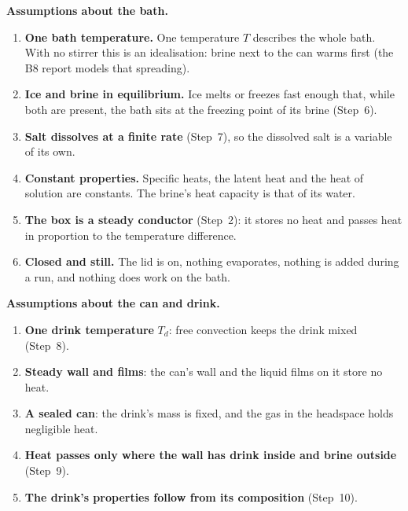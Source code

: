 \documentclass[11pt,a4paper]{article}
\newcommand{\para}[1]{\par\smallskip\noindent\textbf{#1}\enspace}
\begin{document}
\para{Assumptions about the bath.}
\begin{enumerate}[label=\textbf{B\arabic*}]
\item \textbf{One bath temperature.} One temperature $T$ describes the whole bath. With no stirrer this
  is an idealisation: brine next to the can warms first (the B8 report models that spreading).
\item \textbf{Ice and brine in equilibrium.} Ice melts or freezes fast enough that, while both are present,
  the bath sits at the freezing point of its brine (Step~6).
\item \textbf{Salt dissolves at a finite rate} (Step~7), so the dissolved salt is a variable of its own.
\item \textbf{Constant properties.} Specific heats, the latent heat and the heat of solution are
  constants. The brine's heat capacity is that of its water.
\item \textbf{The box is a steady conductor} (Step~2): it stores no heat and passes heat in proportion to
  the temperature difference.
\item \textbf{Closed and still.} The lid is on, nothing evaporates, nothing is added during a run, and
  nothing does work on the bath.
\end{enumerate}

\para{Assumptions about the can and drink.}
\begin{enumerate}[label=\textbf{C\arabic*}]
\item \textbf{One drink temperature} $T_d$: free convection keeps the drink mixed (Step~8).
\item \textbf{Steady wall and films}: the can's wall and the liquid films on it store no heat.
\item \textbf{A sealed can}: the drink's mass is fixed, and the gas in the headspace holds negligible heat.
\item \textbf{Heat passes only where the wall has drink inside and brine outside} (Step~9).
\item \textbf{The drink's properties follow from its composition} (Step~10).
\end{enumerate}
\end{document}
